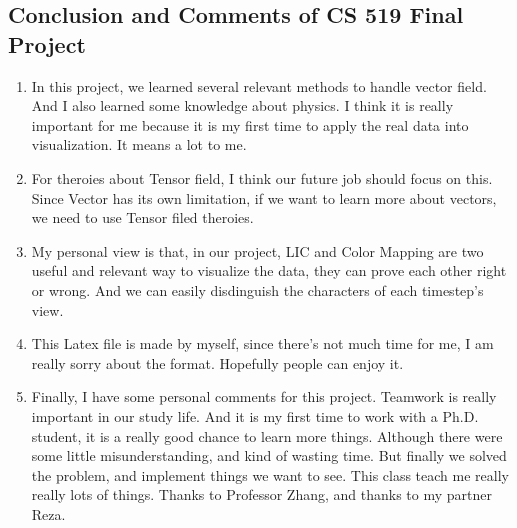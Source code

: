 \documentclass[letterpaper,12pt,titlepage,fleqn]{article}
\begin{document}
\begin{CJK}{UTF8}{gkai}
\clearpage
\section{Conclusion and Comments of CS 519 Final Project}
\begin{enumerate}
\item In this project, we learned several relevant methods to handle vector field. And I also learned some knowledge about physics. I think it is really important for me because it is my first time to apply the real data into visualization. It means a lot to me.\\
\item For theroies about Tensor field, I think our future job should focus on this. Since Vector has its own limitation, if we want to learn more about vectors, we need to use Tensor filed theroies.\\
\item My personal view is that, in our project, LIC and Color Mapping are two useful and relevant way to visualize the data, they can prove each other right or wrong. And we can easily disdinguish the characters of each timestep's view.\\
\item This Latex file is made by myself, since there's not much time for me, I am really sorry about the format. Hopefully people can enjoy it.
\item Finally, I have some personal comments for this project. Teamwork is really important in our study life. And it is my first time to work with a Ph.D. student, it is a really good chance to learn more things. Although there were some little misunderstanding, and kind of wasting time. But finally we solved the problem, and implement things we want to see. This class teach me really really lots of things. Thanks to Professor Zhang, and thanks to my partner Reza.

\end{enumerate}
\clearpage

\end{CJK}
\end{document}
